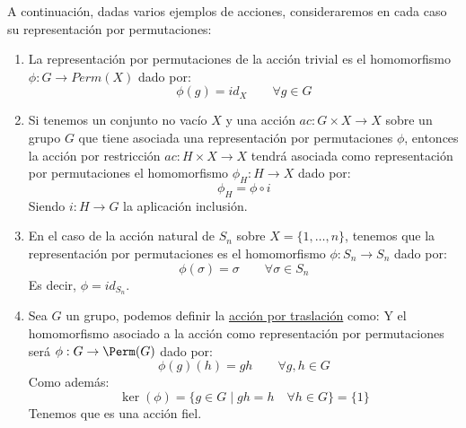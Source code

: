 \begin{ejemplo}
    A continuación, dadas varios ejemplos de acciones, consideraremos en cada caso su representación por permutaciones:
    \begin{enumerate}
        \item La representación por permutaciones de la acción trivial es el homomorfismo $\phi:G\to Perm(X)$ dado por:
            \begin{equation*}
                \phi(g) = id_X \qquad \forall g\in G
            \end{equation*}
        \item Si tenemos un conjunto no vacío $X$ y una acción $ac:G\times X\to X$ sobre un grupo $G$ que tiene asociada una representación por permutaciones $\phi$, entonces la acción por restricción $ac:H\times X\to X$ tendrá asociada como representación por permutaciones el homomorfismo $\phi_H:H\to X$ dado por:
            \begin{equation*}
                \phi_H = \phi \circ i 
            \end{equation*}
            Siendo $i:H\to G$ la aplicación inclusión.
        \item En el caso de la acción natural de $S_n$ sobre $X =\{1,\ldots,n\} $, tenemos que la representación por permutaciones es el homomorfismo $\phi:S_n\to S_n$ dado por:
            \begin{equation*}
                \phi(\sigma) = \sigma \qquad \forall \sigma\in S_n
            \end{equation*}
            Es decir, $\phi = id_{S_n}$.
        \item Sea $G$ un grupo, podemos definir la \underline{acción por traslación} como:
            Y el homomorfismo asociado a la acción como representación por permutaciones será $\phi:G\to \Perm(G)$ dado por:
            \begin{equation*}
                \phi(g)(h) = gh \qquad \forall g,h\in G
            \end{equation*}
            Como además:
            \begin{equation*}
                \ker(\phi) = \{g\in G\mid gh = h \quad \forall h\in G\} = \{1\}
            \end{equation*}
            Tenemos que es una acción fiel.
    \end{enumerate}
\end{ejemplo}

